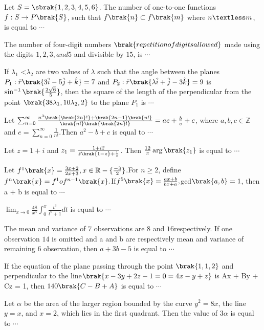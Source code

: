 \iffalse
\title{2023}
\author{AI24BTECH11006}
\section{integer}
\fi
\item Let $S = \sbrak{1, 2, 3, 4, 5, 6}$. The number of one-to-one functions $f : S \to P\brak{S}$, such that $f\brak{n} \subset f\brak{m}$ where $n \textless m$, is equal to $\cdots$
	\hfill{}
\item The number of four-digit numbers $\brak{repetition of digits allowed}$ made using the digits $1, 2, 3, and 5$ and divisible by $15$, is $\cdots$
	\hfill{}
\item If $\lambda_1$ \textless$ \lambda_2$ are two values of $\lambda$ such that the angle between the planes $P_1:\Bar{r}\brak{3\hat{i} - 5\hat{j} + \hat{k} }= 7$ and $P_2: \Bar{r}\brak{\lambda \hat{i} +\hat{j} - 3\hat{k}} = 9$ is 
$\sin^{-1}\brak{\frac{2\sqrt{6}}{5}}$, then the square of the length of the perpendicular from the point $\brak{38\lambda_1, 10\lambda_2, 2}$ to the plane $P_1$ is $\cdots$
\hfill{}
\item Let $\sum_{n=0}^{\infty} \frac{n^3\brak{\brak{2n}!}+\brak{2n-1}\brak{n!}}{\brak{n!}\brak{\brak{2n}!}} = ae+\frac{b}{e}+c$, where $a, b, c \in \mathbb{Z}$ and $e=\sum_{n=0}^{\infty}\frac{1}{n!}$.Then $a^2 - b + c$ is equal to $\cdots$
	\hfill{}
\item Let $ z = 1 + i $ and $z_1=\frac{1+i\Bar{z}}{\Bar{z}\brak{1-z}+\frac{1}{z}}$. Then $\frac{12}{\pi}\arg\brak{z_1}$ is equal to $\cdots$
	\hfill{}
\item Let $f^1\brak{x} =\frac{3x+2}{2x+3} , x \in \mathbb{R}-\{\frac{-3}{2}\}$.For $ n \geq 2 $, define $f^n\brak{x} = f^1of^{n-1}\brak{x}.$If$ f^5\brak{x} = \frac{ax + b}{bx + a},$gcd$\brak{a, b} = 1$,
then  a + b  is equal to $\cdots$
\hfill{}
\item $\lim_{x \to 0} \frac{48}{x^4} \int_0^{x} \frac{t^3}{t^6+1}dt$ is equal to $\cdots$
	\hfill{}
\item The mean and variance of $7$ observations are $8$ and
$16$respectively. If one observation $14$ is omitted
and a and b are respectively mean and variance of
remaining $6$ observation, then $a + 3b -5$ is equal to $\cdots$
\hfill{}
\item If the equation of the plane passing through the
point $\brak{1, 1, 2}$ and perpendicular to the line$\brak{ x - 3y +
2z - 1 = 0 = 4x - y + z}$ is Ax + By + Cz = 1, then
		$140\brak{C - B + A}$ is equal to $\cdots$
		\hfill{}
\item Let $\alpha$ be the area of the larger region bounded by the curve $y^2 = 8x$, the line $y = x$, and $x = 2$, which lies in the first quadrant. Then the value of $3\alpha$ is equal to $\cdots$
	\hfill{}

